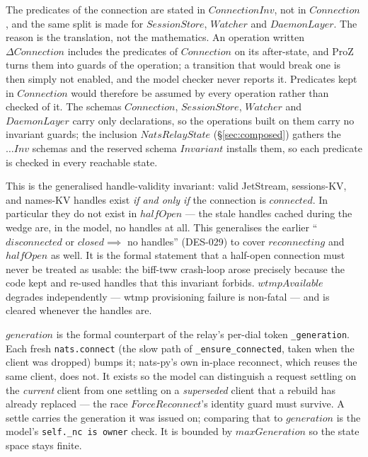 \documentclass[a4paper,10pt,fleqn]{article}
\begin{document}
The predicates of the connection are stated in $ConnectionInv$, not in
$Connection$, and the same split is made for $SessionStore$, $Watcher$
and $DaemonLayer$.  The reason is the translation, not the mathematics.
An operation written $\Delta Connection$ includes the predicates of
$Connection$ on its after-state, and ProZ turns them into guards of the
operation; a transition that would break one is then simply not enabled,
and the model checker never reports it.  Predicates kept in $Connection$
would therefore be assumed by every operation rather than checked of it.
The schemas $Connection$, $SessionStore$, $Watcher$ and $DaemonLayer$
carry only declarations, so the operations built on them carry no
invariant guards; the inclusion $NatsRelayState$ (\S\ref{sec:composed})
gathers the $\ldots Inv$ schemas and the reserved schema $Invariant$
installs them, so each predicate is checked in every reachable state.

This is the generalised handle-validity invariant: valid
JetStream, sessions-KV, and names-KV handles exist \emph{if and
only if} the connection is $connected$.  In particular they do
not exist in $halfOpen$ --- the stale handles cached during the
wedge are, in the model, no handles at all.  This generalises the
earlier ``$disconnected$ or $closed \implies$ no handles'' (DES-029)
to cover $reconnecting$ and $halfOpen$ as well.  It is the
formal statement that a half-open connection must never be treated
as usable: the biff-tww crash-loop arose precisely because the code
kept and re-used handles that this invariant forbids.
$wtmpAvailable$ degrades independently --- wtmp provisioning
failure is non-fatal --- and is cleared whenever the handles are.

$generation$ is the formal counterpart of the relay's per-dial
token \texttt{\_generation}.  Each fresh \texttt{nats.connect}
(the slow path of \texttt{\_ensure\_connected}, taken when the
client was dropped) bumps it; nats-py's own in-place reconnect,
which reuses the same client, does not.  It exists so the model
can distinguish a request settling on the \emph{current} client
from one settling on a \emph{superseded} client that a rebuild has
already replaced --- the race $ForceReconnect$'s identity guard
must survive.  A settle carries the generation it was issued on;
comparing that to $generation$ is the model's \texttt{self.\_nc is
owner} check.  It is bounded by $maxGeneration$ so the state space
stays finite.
\end{document}
